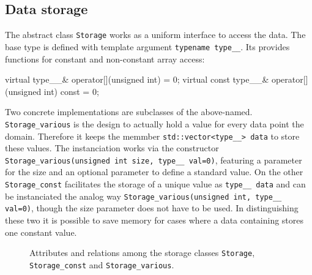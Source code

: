\subsection{Data storage}
The abstract class \verb|Storage| works as a uniform interface to access the data. The base type is defined with template argument \verb|typename type__|. Its provides functions for constant and non-constant array access:
\begin{codelisting1}
	virtual type__& operator[](unsigned int) = 0;
	virtual const type__& operator[](unsigned int) const = 0;
\end{codelisting1}
Two concrete implementations are subclasses of the above-named. \verb|Storage_various| is the design to actually hold a value for every data point the domain. Therefore it keeps the memmber \verb|std::vector<type__> data| to store these values. The instanciation works via the constructor \verb|Storage_various(unsigned int size, type__ val=0)|, featuring a parameter for the size and an optional parameter to define a standard value. On the other \verb|Storage_const| facilitates the storage of a unique value as \verb|type__ data| and can be instanciated the analog way \verb|Storage_various(unsigned int, type__ val=0)|, though the size parameter does not have to be used. In distinguishing these two it is possible to save memory for cases where a data containing stores one constant value.
\def\y{-5}
\def\x{5}
\def\dx{4}
\def\scale{0.6}
\begin{figure}[h!]
	\centering
\caption{Attributes and relations among the storage classes \texttt{Storage}, \texttt{Storage\_const} and \texttt{Storage\_various}. }
\end{figure}


